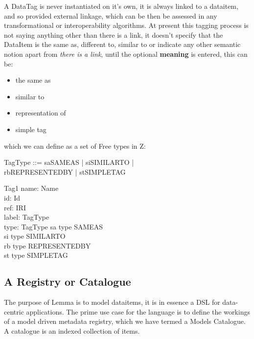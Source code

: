 \documentclass[a4paper,twoside]{article}
\begin{document}
A DataTag is never instantiated on it's own, it is always linked to a dataitem, and so provided external linkage, which can be then be assessed in any transformational or interoperability algorithms. At present this tagging process is not saying anything other than there is a link, it doesn't specify that the DataItem is the same as, different to, similar to or indicate any other semantic notion apart from \emph{there is a link}, until the optional \textbf{meaning} is entered, this can be:

\begin{itemize}
	\item  the same as
	\item  similar to 
	\item  representation of 
	\item  simple tag
\end{itemize}

which we can define as a set of Free types in Z:
\begin{zed}
\end{zed}


\begin{zed}
	TagType ::=  sa\ldata SAMEAS \rdata | si\ldata SIMILARTO \rdata |\\ rb\ldata REPRESENTEDBY \rdata | st\ldata SIMPLETAG \rdata
\end{zed}

\begin{schema}{Tag1}
	name: Name \\
	id: Id \\
	ref: IRI \\
	label: TagType \\
	type: TagType
	\where
	sa \inv type \in SAMEAS \lor \\
	si \inv type \in SIMILARTO \lor \\
	rb \inv type \in REPRESENTEDBY \lor\\
	st \inv type \in SIMPLETAG \\
\end{schema}


\subsection{A Registry or Catalogue}

The purpose of Lemma is to model dataitems, it is in essence a DSL for data-centric applications. The prime use case for the language is to define the workings of a model driven metadata registry, which we have termed a Models Catalogue.   A catalogue is an indexed collection of items. 
\end{document}
